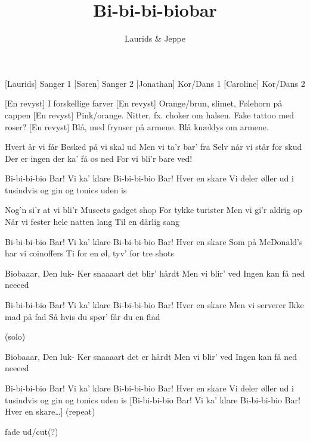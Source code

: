\documentclass[a4paper,11pt]{article}
\title{Bi-bi-bi-biobar}
\author{Laurids \& Jeppe}
\begin{document}
\maketitle

\begin{roles}
  [Laurids] Sanger 1
  [Søren] Sanger 2
  [Jonathan] Kor/Dans 1
  [Caroline] Kor/Dans 2
\end{roles}

\begin{props}
    [En revyst] I forskellige farver
    [En revyst] Orange/brun, slimet, Følehorn på cappen
    [En revyst] Pink/orange. Nitter, fx. choker om halsen. Fake tattoo med roser?
    [En revyst] Blå, med frynser på armene. Blå knæklys om armene.
\end{props}

\begin{center}
\end{center} 

\begin{song}
 Hvert år vi får
Besked på vi skal ud
Men vi ta’r bar’ fra
Selv når vi står for skud
Der er ingen der ka’ få os ned
For vi bli’r bare ved!


Bi-bi-bi-bio Bar!
Vi ka’ klare
Bi-bi-bi-bio Bar!
Hver en skare
Vi deler øller ud
i tusindvis
og gin og tonics uden is


Nog’n si’r at vi bli’r
Museets gadget shop
For tykke turister
Men vi gi’r aldrig op
Når vi fester hele natten lang
Til en dårlig sang


Bi-bi-bi-bio Bar!
Vi ka’ klare
Bi-bi-bi-bio Bar!
Hver en skare
Som på McDonald’s har 
vi coinoffers
Ti for en øl, tyv’ for tre shots


Biobaaar, Den luk-
Ker snaaaart det blir’ hårdt
Men vi blir’ ved
Ingen kan få ned neeeed




Bi-bi-bi-bio Bar!
Vi ka’ klare
Bi-bi-bi-bio Bar!
Hver en skare
Men vi serverer
Ikke mad på fad
Så hvis du spør’ får du en flad


(solo)


Biobaaar, Den luk-
Ker snaaaart det er hårdt
Men vi blir’ ved
Ingen kan få ned neeeed


Bi-bi-bi-bio Bar!
Vi ka’ klare
Bi-bi-bi-bio Bar!
Hver en skare
Vi deler øller ud
i tusindvis
og gin og tonics uden is
[Bi-bi-bi-bio Bar!
Vi ka’ klare
Bi-bi-bi-bio Bar!
Hver en skare…] (repeat)


\scene fade ud/cut(?)
\end{song}
\end{document}
